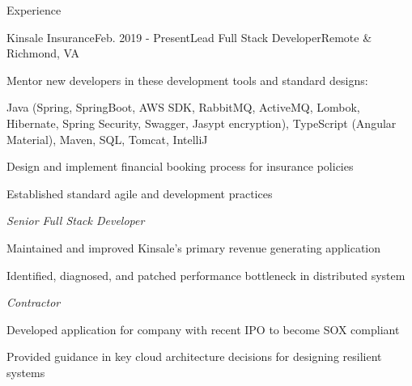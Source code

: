 \documentclass{resume} %
\begin{document}

\begin{rSection}{Experience}

\begin{rSubsection}{Kinsale Insurance}{Feb. 2019 - Present}{\vspace{-0.5em}Lead Full Stack Developer}{Remote \& Richmond, VA}
	\setlength{\itemindent}{.0in}\item{
		Mentor new developers in these development tools and standard designs:
	}
	\setlength{\itemindent}{.0in}\item{
		Java (Spring, SpringBoot, AWS SDK, RabbitMQ, ActiveMQ, Lombok, Hibernate, Spring Security, Swagger, Jasypt encryption), TypeScript (Angular Material), Maven, SQL, Tomcat, IntelliJ
	}
	\setlength{\itemindent}{.0in}\item{
		Design and implement financial booking process for insurance policies
	}
	\setlength{\itemindent}{.0in}\item{
		Established standard agile and development practices 
	}
	

    \emph{Senior Full Stack Developer}
    \setlength{\itemindent}{.0in}\item{
    	Maintained and improved Kinsale's primary revenue generating application
    }
	\setlength{\itemindent}{.0in}\item{
		Identified, diagnosed, and patched performance bottleneck in distributed system
	}
	
	
	\emph{Contractor}
	\setlength{\itemindent}{.0in}\item{ 
		Developed application for company with recent IPO to become SOX compliant
	}
	\setlength{\itemindent}{.0in}\item{ 
		Provided guidance in key cloud architecture decisions for designing resilient systems
	}
	
	
\end{rSubsection}



\end{rSection}
\end{document}
